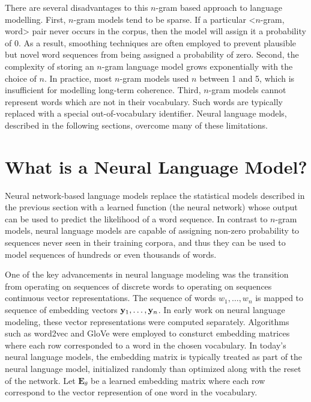 There are several disadvantages to this $n$-gram based approach to language modelling.
First, $n$-gram models tend to be sparse.
If a particular <$n$-gram, word> pair never occurs in the corpus, then the model will assign it a probability of 0.
As a result, smoothing techniques are often employed to prevent plausible but novel word sequences from being assigned a probability of zero.
Second, the complexity of storing an $n$-gram language model grows exponentially with the choice of $n$.
In practice, most $n$-gram models used $n$ between 1 and 5, which is insufficient for modelling long-term coherence.
Third, $n$-gram models cannot represent words which are not in their vocabulary.
Such words are typically replaced with a special out-of-vocabulary identifier.
Neural language models, described in the following sections, overcome many of these limitations.


\section{What is a Neural Language Model?}

Neural network-based language models replace the statistical models described in the previous section with a learned function (the neural network) whose output can be used to predict the likelihood of a word sequence.
In contrast to $n$-gram models, neural language models are capable of assigning non-zero probability to sequences never seen in their training corpora, and thus they can be used to model sequences of hundreds or even thousands of words.

One of the key advancements in neural language modeling was the transition from operating on sequences of discrete words to operating on sequences continuous vector representations.
The sequence of words $w_1, \ldots, w_n$ is mapped to sequence of embedding vectors $\mathbf{y}_1, \ldots, \mathbf{y}_n$.
In early work on neural language modeling, these vector representations were computed separately.
Algorithms such as word2vec \citep{mikolov2013word2vec} and GloVe \citep{pennington2014glove} were employed to consturct embedding matrices where each row corresponded to a word in the chosen vocabulary.
In today's neural language models, the embedding matrix is typically treated as part of the neural language model, initialized randomly than optimized along with the reset of the network.
Let $\mathbf{E}_\theta$ be a learned embedding matrix where each row correspond to the vector represention of one word in the vocabulary.

